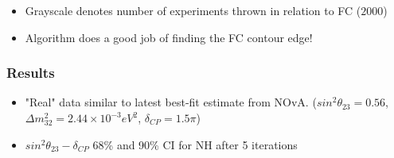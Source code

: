 \documentclass[9pt, aspectratio=169]{beamer}
\begin{document}
\begin{frame}
\begin{columns}
  \end{columns}
  \begin{itemize}
    \item Grayscale denotes number of experiments thrown in relation to FC ($2000$)
    \item Algorithm does a good job of finding the FC contour edge!  
  \end{itemize}
\end{frame}

\begin{frame}
  \frametitle{Results}
  \begin{itemize}
    \item "Real" data similar to latest best-fit estimate from NOvA. ($sin^{2}\theta_{23} = 0.56$, $\Delta m^2_{32} = 2.44\times10^{-3} eV^{2}$, $\delta_{CP} = 1.5\pi$)
    \item $sin^{2}\theta_{23}-\delta_{CP}$ 68\% and 90\% CI for NH after 5 iterations
  \end{itemize}
  \begin{columns}

\end{columns}
\end{frame}
\end{document}
